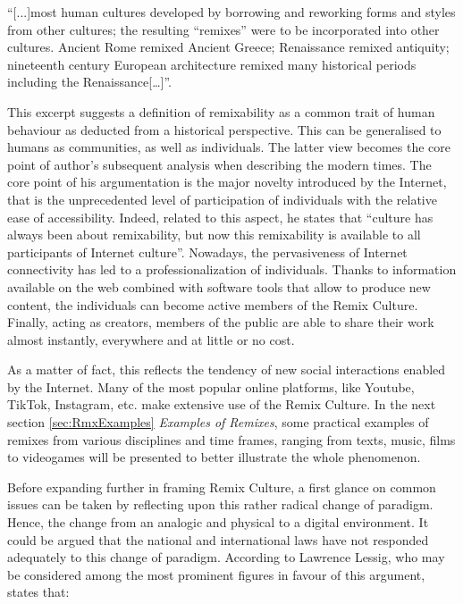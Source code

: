 \begin{displayquote}
    “[...]most human cultures developed by borrowing and reworking forms and styles from other cultures; the resulting “remixes” were to be incorporated into other cultures. Ancient Rome remixed Ancient Greece; Renaissance remixed antiquity; nineteenth century European architecture remixed many historical periods including the Renaissance[…]”.
\end{displayquote}

This excerpt suggests a definition of remixability as a common trait of human behaviour as deducted from a historical perspective. This can be generalised to humans as communities, as well as individuals. The latter view becomes the core point of author’s subsequent analysis when describing the modern times. The core point of his argumentation is the major novelty introduced by the Internet, that is the unprecedented level of participation of individuals with the relative ease of accessibility. Indeed, related to this aspect, he states that “culture has always been about remixability, but now this remixability is available to all participants of Internet culture”\cite{ManovichRemixability}. Nowadays, the pervasiveness of Internet connectivity has led to a professionalization of individuals. Thanks to information available on the web combined with software tools that allow to produce new content, the individuals can become active members of the Remix Culture. Finally, acting as creators, members of the public are able to share their work almost instantly, everywhere and at little or no cost. 

As a matter of fact, this reflects the tendency of new social interactions enabled by the Internet. Many of the most popular online platforms, like Youtube, TikTok, Instagram, etc. make extensive use of the Remix Culture. In the next section \ref{sec:RmxExamples} \emph{Examples of Remixes}, some practical examples of remixes from various disciplines and time frames, ranging from texts, music, films to videogames will be presented to better illustrate the whole phenomenon.

Before expanding further in framing Remix Culture, a first glance on common issues can be taken by reflecting upon this rather radical change of paradigm. Hence, the change from an analogic and physical to a digital environment. It could be argued that the national and international laws have not responded adequately to this change of paradigm. According to Lawrence Lessig, who may be considered among the most prominent figures in favour of this argument, states that: 

